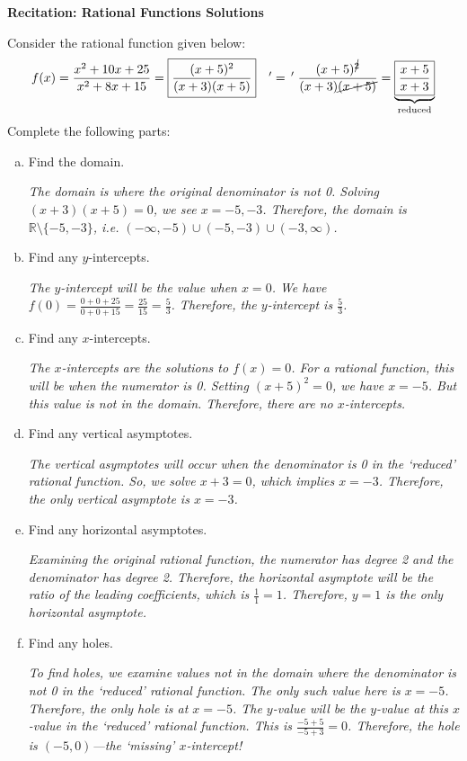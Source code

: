 \documentclass[11pt,letterpaper]{article}
\begin{document}

\phantom{} \hfill {\bfseries \Large Recitation: Rational Functions Solutions} \hfill \phantom{} \par\vspace{0.5cm}

 Consider the rational function given below:
	\[
	f(x)= \dfrac{x^2 + 10x + 25}{x^2 + 8x + 15}= \boxed{\dfrac{(x + 5)^2}{(x + 3)(x + 5)}} \quad '=\, ' \; \dfrac{(x + 5)^{\cancel{2}}}{(x + 3) \cancel{(x + 5)}}= \underbrace{\boxed{\dfrac{x + 5}{x + 3}}}_{\text{reduced}}
	\]
Complete the following parts:
	\begin{enumerate}[(a)]
	\item Find the domain. \par
	{\itshape The domain is where the original denominator is not 0. Solving $(x + 3)(x + 5)= 0$, we see $x= -5, -3$. Therefore, the domain is $\mathbb{R} \setminus \{ -5, -3 \}$, i.e. $(-\infty, -5) \cup (-5, -3) \cup (-3, \infty)$.} \vfill
	
	\item Find any $y$-intercepts. \par
	{\itshape The $y$-intercept will be the value when $x= 0$. We have $f(0)= \tfrac{0 + 0 + 25}{0 + 0 + 15}= \tfrac{25}{15}= \tfrac{5}{3}$. Therefore, the $y$-intercept is $\tfrac{5}{3}$.} \vfill
	
	\item Find any $x$-intercepts. \par
	{\itshape The $x$-intercepts are the solutions to $f(x)= 0$. For a rational function, this will be when the numerator is 0. Setting $(x + 5)^2= 0$, we have $x= -5$. But this value is not in the domain. Therefore, there are no $x$-intercepts.} \vfill
	
	\item Find any vertical asymptotes. \par
	{\itshape The vertical asymptotes will occur when the denominator is 0 in the `reduced' rational function. So, we solve $x + 3= 0$, which implies $x= -3$. Therefore, the only vertical asymptote is $x= -3$.} \vfill
	
	\item Find any horizontal asymptotes. \par
	{\itshape Examining the original rational function, the numerator has degree 2 and the denominator has degree 2. Therefore, the horizontal asymptote will be the ratio of the leading coefficients, which is $\tfrac{1}{1}= 1$. Therefore, $y= 1$ is the only horizontal asymptote.} \vfill
	
	\item Find any holes. \par
	{\itshape To find holes, we examine values not in the domain where the denominator is not 0 in the `reduced' rational function. The only such value here is $x= -5$. Therefore, the only hole is at $x= -5$. The $y$-value will be the $y$-value at this $x$-value in the `reduced' rational function. This is $\tfrac{-5 + 5}{-5 + 3}= 0$. Therefore, the hole is $(-5, 0)$---the `missing' $x$-intercept!} 
	\end{enumerate} \vfill
\end{document}
